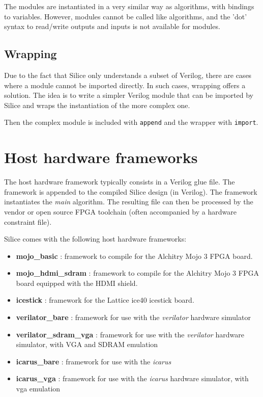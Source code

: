 \documentclass[a4]{article}
\newcommand\todo[1]{{\color{magenta}\textbf{TODO:} #1}}
\newcommand\verilog{Verilog}
\newcommand\silice{Silice}
\begin{document}
The modules are instantiated in a very similar way as algorithms, with bindings to variables. However, modules cannot be called like algorithms, and the 'dot' syntax to read/write outputs and inputs is not available for modules.

\subsection{Wrapping}

Due to the fact that \silice{} only understands a subset of \verilog{}, there
are cases where a module cannot be imported directly. In such cases, wrapping
offers a solution. The idea is to write a simpler \verilog{} module that can be imported by \silice{} and wraps the instantiation of the more complex one.

Then the complex module is included with \texttt{append} and the wrapper with \texttt{import}.


\section{Host hardware frameworks}
\label{sec:host}

The host hardware framework typically consists in a \verilog{} glue file. The framework is appended to the compiled \silice{} design (in \verilog{}). The framework instantiates the \textit{main} algorithm. The resulting file can then be processed by the vendor or open source FPGA toolchain (often accompanied by a hardware constraint file).

\silice{} comes with the following host hardware frameworks:
\begin{itemize}
	\item \textbf{mojo\_basic} : framework to compile for the Alchitry Mojo 3 FPGA board.
	\item \textbf{mojo\_hdmi\_sdram} : framework to compile for the Alchitry Mojo 3 FPGA board equipped with the HDMI shield.
	\item \textbf{icestick} : framework for the Lattice ice40 icestick board.
	\item \textbf{verilator\_bare} : framework for use with the \textit{verilator} hardware simulator
	\item \textbf{verilator\_sdram\_vga} : framework for use with the \textit{verilator} hardware simulator, with VGA and SDRAM emulation
	\item \textbf{icarus\_bare} : framework for use with the \textit{icarus}
	\item \textbf{icarus\_vga} : framework for use with the \textit{icarus} hardware simulator, with vga emulation
\end{itemize}
\end{document}
